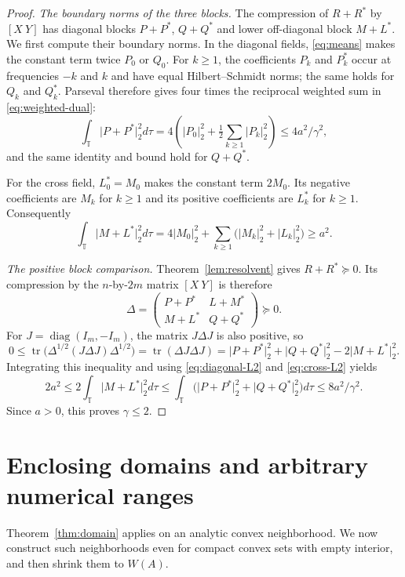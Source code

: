 \documentclass[11pt]{article}
\newcommand{\T}{\mathbb T}
\newcommand{\HS}[1]{\lvert #1\rvert_2}
\DeclareMathOperator{\tr}{tr}
\DeclareMathOperator{\diag}{diag}
\theoremstyle{remark}\newtheorem{remark}[theorem]{Remark}
\numberwithin{equation}{section}
\begin{document}
\begin{proof}
\emph{The boundary norms of the three blocks.}
The compression of $R+R^*$ by $[X\ Y]$ has diagonal blocks $P+P^*$,
$Q+Q^*$ and lower off-diagonal block $M+L^*$. We first compute their
boundary norms. In the diagonal fields, \eqref{eq:means} makes the
constant term twice $P_0$ or $Q_0$. For $k\ge1$, the coefficients $P_k$
and $P_k^*$ occur at frequencies $-k$ and $k$ and have equal
Hilbert--Schmidt norms; the same holds for $Q_k$ and $Q_k^*$.
Parseval therefore gives four times the reciprocal weighted sum in
\eqref{eq:weighted-dual}:
\begin{equation}\label{eq:diagonal-L2}
 \int_\T\HS{P+P^*}^2d\tau
 =4\left(\HS{P_0}^2+\tfrac12\sum_{k\ge1}\HS{P_k}^2\right)
 \le4a^2/\gamma^2,
\end{equation}
and the same identity and bound hold for $Q+Q^*$.

For the cross field, $L_0^*=M_0$ makes the constant term $2M_0$.
Its negative coefficients are $M_k$ for $k\ge1$ and its positive
coefficients are $L_k^*$ for $k\ge1$. Consequently
\begin{equation}\label{eq:cross-L2}
 \int_\T\HS{M+L^*}^2d\tau
 =4\HS{M_0}^2+\sum_{k\ge1}\bigl(\HS{M_k}^2+\HS{L_k}^2\bigr)
 \ge a^2.
\end{equation}

\emph{The positive block comparison.}
Theorem~\ref{lem:resolvent} gives $R+R^*\succeq0$. Its compression by the
$n$-by-$2m$ matrix $[X\ Y]$ is therefore
\[
 \Delta=\begin{pmatrix}P+P^*&L+M^*\\M+L^*&Q+Q^*\end{pmatrix}\succeq0.
\]
For $J=\diag(I_m,-I_m)$, the matrix $J\Delta J$ is also positive, so
\[
 0\le\tr\bigl(\Delta^{1/2}(J\Delta J)\Delta^{1/2}\bigr)
 =\tr(\Delta J\Delta J)
 =\HS{P+P^*}^2+\HS{Q+Q^*}^2-2\HS{M+L^*}^2.
\]
Integrating this inequality and using \eqref{eq:diagonal-L2} and \eqref{eq:cross-L2} yields
\[
 2a^2\le2\int_\T\HS{M+L^*}^2d\tau
 \le\int_\T\bigl(\HS{P+P^*}^2+\HS{Q+Q^*}^2\bigr)d\tau
 \le8a^2/\gamma^2.
\]
Since $a>0$, this proves $\gamma\le2$.
\end{proof}
\section{Enclosing domains and arbitrary numerical ranges}\label{sec:limit}
Theorem~\ref{thm:domain} applies on an analytic convex neighborhood. We now construct such neighborhoods even for compact convex sets with empty interior, and then shrink them to $W(A)$.
\end{document}
